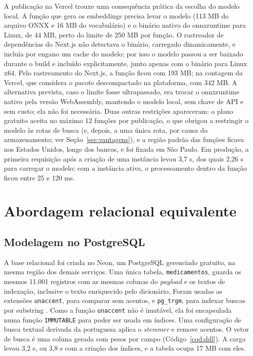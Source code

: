 \documentclass[12pt,oneside,a4paper,english,brazil]{abntex2}
\newcommand{\campo}[1]{\texttt{#1}}
\begin{document}
A publicação na Vercel trouxe uma consequência prática da escolha do modelo local. A função que gera os embeddings precisa levar o modelo (113 MB do arquivo ONNX e 16 MB do vocabulário) e o binário nativo do onnxruntime para Linux, de 44 MB, perto do limite de 250 MB por função. O rastreador de dependências do Next.js não detectava o binário, carregado dinamicamente, e incluía por engano um cache do modelo; por isso o modelo passou a ser baixado durante o build e incluído explicitamente, junto apenas com o binário para Linux x64. Pelo rastreamento do Next.js, a função ficou com 193 MB; na contagem da Vercel, que considera o pacote descompactado na plataforma, com 342 MB. A alternativa prevista, caso o limite fosse ultrapassado, era trocar o onnxruntime nativo pela versão WebAssembly, mantendo o modelo local, sem chave de API e sem custo; ela não foi necessária. Duas outras restrições apareceram: o plano gratuito aceita no máximo 12 funções por publicação, o que obrigou a restringir o modelo às rotas de busca (e, depois, a uma única rota, por causa do armazenamento; ver Seção~\ref{sec:vantagens}), e a região padrão das funções ficava nos Estados Unidos, longe dos bancos, e foi fixada em São Paulo. Em produção, a primeira requisição após a criação de uma instância levou 3,7 s, dos quais 2,26 s para carregar o modelo; com a instância ativa, o processamento dentro da função ficou entre 25 e 120 ms.

\chapter{Abordagem relacional equivalente}

\section{Modelagem no PostgreSQL}

A base relacional foi criada no Neon, um PostgreSQL gerenciado gratuito, na mesma região dos demais serviços. Uma única tabela, \campo{medicamentos}, guarda os mesmos 11.001 registros com as mesmas colunas do \emph{payload} e os textos de indexação, inclusive o texto enriquecido pelo dicionário. Foram usadas as extensões \campo{unaccent}, para comparar sem acentos, e \campo{pg\_trgm}, para indexar buscas por substring \cite{pgtrgm}. Como a função \campo{unaccent} não é imutável, ela foi encapsulada numa função \campo{IMMUTABLE} para poder ser usada em índices. Uma configuração de busca textual derivada da portuguesa aplica o \emph{stemmer} e remove acentos. O vetor de busca é uma coluna gerada com pesos por campo (Código~\ref{cod:ddl}). A carga levou 3,2 s, ou 3,8 s com a criação dos índices, e a tabela ocupa 17 MB com eles.
\end{document}
